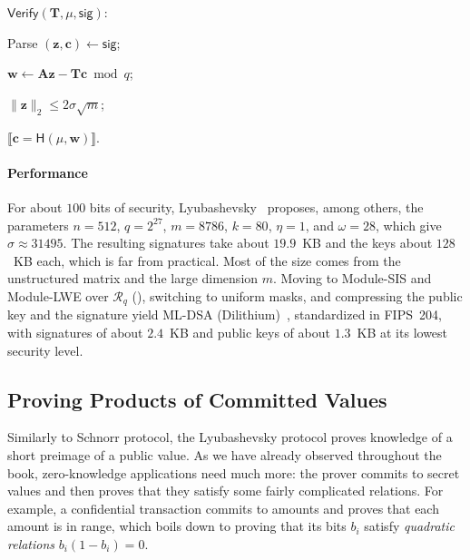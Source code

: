 \documentclass[../../book.tex]{subfiles}
\begin{document}
\begin{algoproto}[ht]
\begin{mdframed}[linecolor=black, linewidth=1pt,
                     skipabove=10pt, skipbelow=10pt,
                     innerleftmargin=5pt, innerrightmargin=5pt]
\begin{minipage}[t]{0.38\linewidth}
        \end{minipage}
        \hfill
        \begin{minipage}[t]{0.33\linewidth}
            \colorbox{oc-blue-1}{$\mathsf{Verify}(\mathbf{T}, \mu, \mathsf{sig})$:}
            \begin{algoen}
                \item Parse $(\mathbf{z},\mathbf{c}) \gets \mathsf{sig}$;
                \item $\mathbf{w} \gets \mathbf{A}\mathbf{z} - \mathbf{T}\mathbf{c} \bmod q$;
                \item {} $\|\mathbf{z}\|_2 \leq 2\sigma\sqrt{m}$;
                \item {} $\llbracket \mathbf{c} = \mathsf{H}(\mu, \mathbf{w}) \rrbracket$.
            \end{algoen}
        \end{minipage}
    \end{mdframed}
    \caption{The Lyubashevsky signature scheme~\cite{EC:Lyubashevsky12}. The matrix $\mathbf{A} \leftarrowS \mathbb{Z}_q^{n \times m}$ is a public parameter and $\sigma := 12\eta\omega\sqrt{m}$.}
    \label{fig:lyu-signature}
\end{algoproto}

\paragraph{Performance}
For about $100$ bits of security, Lyubashevsky~\cite{EC:Lyubashevsky12} proposes, among others, the parameters $n = 512$, $q = 2^{27}$, $m = 8786$, $k = 80$, $\eta = 1$, and $\omega = 28$, which give $\sigma \approx 31495$.
The resulting signatures take about $19.9$~KB and the keys about $128$~KB each, which is far from practical.
Most of the size comes from the unstructured matrix and the large dimension $m$.
Moving to Module-SIS and Module-LWE over $\mathcal{R}_q$ (), switching to uniform masks, and compressing the public key and the signature yield ML-DSA (Dilithium)~\cite{TCHES:DKLLSS18}, standardized in FIPS~204, with signatures of about $2.4$~KB and public keys of about $1.3$~KB at its lowest security level.

\subsection{Proving Products of Committed Values}\label{section:als20}

Similarly to Schnorr protocol, the Lyubashevsky protocol proves knowledge of a short preimage of a public value.
As we have already observed throughout the book, zero-knowledge applications need much more: the prover commits to secret values and then proves that they satisfy some fairly complicated relations.
For example, a confidential transaction commits to amounts and proves that each amount is in range, which boils down to proving that its bits $b_i$ satisfy \emph{quadratic relations} $b_i(1-b_i) = 0$.
\end{document}
